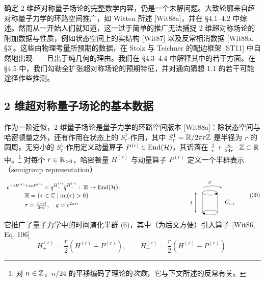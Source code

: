
确定 2 维超对称量子场论的完整数学内容，仍是一个未解问题。大致轮廓来自超对称量子力学的环路空间推广，如 Witten 所述 [Wit88a]，并在 §4.1–4.2 中综述。然而从一开始人们就知道，这一过于简单的推广无法捕捉 2 维超对称场论的附加数据与性质，例如状态空间上的实结构 [Wit87] 以及反常相消数据 [Wit88a, §3]。这些由物理考量所预期的数据，在 Stolz 与 Teichner 的配边框架 [ST11] 中自然地出现——且出于纯几何的理由。我们在 §4.3–4.4 中解释其中的若干方面。在 §4.5 中，我们勾勒全扩张超对称场论的预期特征，并对通向猜想 1.1 的若干可能途径作些推测。

\subsection{2 维超对称量子场论的基本数据}

作为一阶近似，2 维量子场论是量子力学的环路空间版本 [Wit88a]：除状态空间与哈密顿量之外，还有作用在状态上的 $S^1_r$-作用，其中 $S^1_r=\mathbb{R}/2\pi r\mathbb{Z}$ 是半径为 $r$ 的圆周。无穷小的 $S^1_r$-作用定义动量算子 $P^{(r)}\in\mathrm{End}(\mathcal{H})$，其谱落在 $\frac1r+\frac{n}{24r}\cdot\mathbb{Z}\subset\mathbb{R}$ 中。\footnote{对 $n\in\mathbb{Z}$，$n/24$ 的平移编码了理论的\emph{次数}，它与下文所述的反常有关。} 对每个 $r\in\mathbb{R}_{>0}$，哈密顿量 $H^{(r)}$ 与动量算子 $P^{(r)}$ 定义一个半群表示（semigroup representation）
\begin{equation}
\begin{tikzpicture}[baseline=(current bounding box.center), >=stealth]
  \node[anchor=west] (a) at (0,0.62) {$e^{-tH^{(r)}+ixP^{(r)}}=q^{H^{(r)}_+}\bar q^{H^{(r)}_-}:\ \HH\to\mathrm{End}(\cH),$};
  \node[anchor=west] (b) at (1.05,0.06) {$\HH=\{\tau\in\C\mid\operatorname{im}(\tau)>0\}$};
  \node[anchor=west] (c) at (1.05,-0.50) {$\tau=\frac{x+it}{2\pi r},\quad q=e^{2\pi i\tau}$};
  \draw (11.62,-0.92) -- (11.62,0.24);
  \draw (12.52,-0.92) -- (12.52,0.24);
  \draw (12.07,0.24) ellipse (0.45 and 0.135);
  \draw (12.07,-0.92) ellipse (0.45 and 0.135);
  \fill (12.44,0.19) circle (1.6pt);
  \fill (11.72,-0.97) circle (1.6pt);
  \draw[<->] (11.22,-0.92) -- (11.22,0.24);
  \node at (10.98,-0.34) {$t$};
  \draw[->] (11.66,0.52) arc (152:28:0.62 and 0.24);
  \node at (12.07,0.86) {$x$};
  \node[anchor=west] at (12.82,-0.34) {$C_{r,\tau}$};
\end{tikzpicture}
\tag{39}
\end{equation}
它推广了量子力学中的时间演化半群 (6)，其中（为后文方便）引入算子 [Wit86, Eq. 106]
\begin{equation}
H^{(r)}_+=\frac r2\left(H^{(r)}+P^{(r)}\right),\qquad H^{(r)}_-=\frac r2\left(H^{(r)}-P^{(r)}\right).
\tag{40}
\end{equation}

